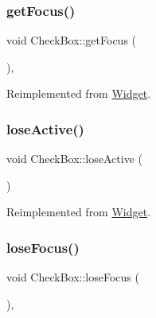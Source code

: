 \mbox{\label{class_check_box_a86a6399e17216849708c07ed51df3510}} 
\subsubsection{\texorpdfstring{getFocus()}{getFocus()}}
{\footnotesize\ttfamily void Check\+Box\+::get\+Focus (\begin{DoxyParamCaption}{ }\end{DoxyParamCaption})\hspace{0.3cm}{\ttfamily [override]}, {\ttfamily [virtual]}}



Reimplemented from \mbox{\hyperlink{class_widget_a546c3b96bd793596c4902b4df0c41272}{Widget}}.

\mbox{\label{class_check_box_aa4eb44d9c99f24b566233ec7d0504808}} 
\subsubsection{\texorpdfstring{loseActive()}{loseActive()}}
{\footnotesize\ttfamily void Check\+Box\+::lose\+Active (\begin{DoxyParamCaption}{ }\end{DoxyParamCaption})\hspace{0.3cm}{\ttfamily [virtual]}}



Reimplemented from \mbox{\hyperlink{class_widget_a8d15d94eb8e41a82e9c4c0ee70a449b6}{Widget}}.

\mbox{\label{class_check_box_a071873f266cc4b88eb077bc7d0ec7524}} 
\subsubsection{\texorpdfstring{loseFocus()}{loseFocus()}}
{\footnotesize\ttfamily void Check\+Box\+::lose\+Focus (\begin{DoxyParamCaption}{ }\end{DoxyParamCaption})\hspace{0.3cm}{\ttfamily [override]}, {\ttfamily [virtual]}}




